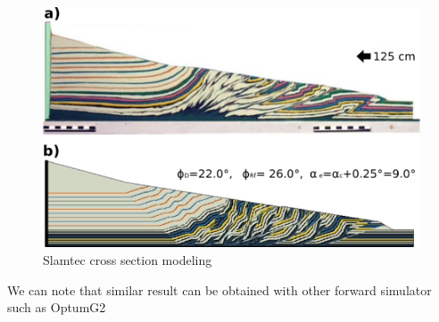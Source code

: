 \documentclass[12pt, a4paper]{report} %
\begin{document}
\begin{figure}[H]
	\centering
	\includegraphics[scale=0.5]{slamtec.png}
	\caption{Slamtec cross section modeling}
	\label{slam}
\end{figure}
We can note that similar result can be obtained with other forward simulator such as OptumG2 \cite{Optum}
\end{document}
